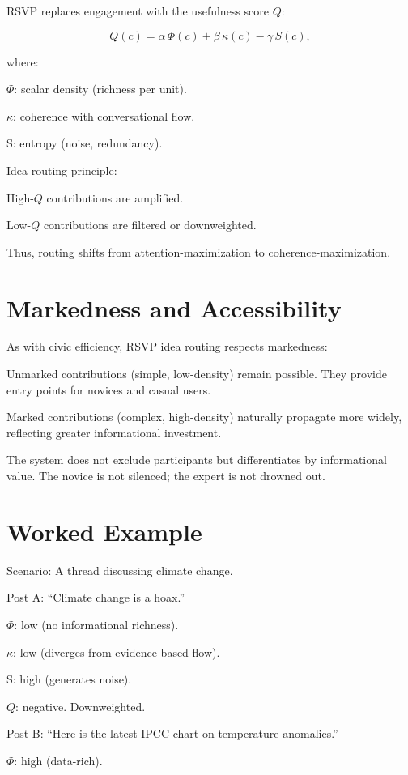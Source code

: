 \documentclass{book}
\begin{document}
RSVP replaces engagement with the usefulness score \( Q \):

\[ Q(c) = \alpha \, \Phi(c) + \beta \, \kappa(c) - \gamma \, S(c), \]

where:

\(\Phi\): scalar density (richness per unit).

\(\kappa\): coherence with conversational flow.

S: entropy (noise, redundancy).

Idea routing principle:

High-\( Q \) contributions are amplified.

Low-\( Q \) contributions are filtered or downweighted.

Thus, routing shifts from attention-maximization to coherence-maximization.

\section{Markedness and Accessibility}

As with civic efficiency, RSVP idea routing respects markedness:

Unmarked contributions (simple, low-density) remain possible. They provide entry points for novices and casual users.

Marked contributions (complex, high-density) naturally propagate more widely, reflecting greater informational investment.

The system does not exclude participants but differentiates by informational value. The novice is not silenced; the expert is not drowned out.

\section{Worked Example}

Scenario: A thread discussing climate change.

Post A: ``Climate change is a hoax.''

\(\Phi\): low (no informational richness).

\(\kappa\): low (diverges from evidence-based flow).

S: high (generates noise).

\( Q \): negative. Downweighted.

Post B: ``Here is the latest IPCC chart on temperature anomalies.''

\(\Phi\): high (data-rich).
\end{document}
